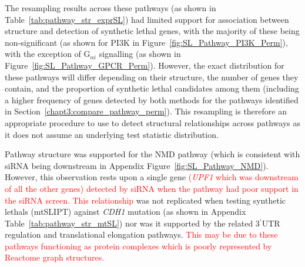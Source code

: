 The resampling results across these \glspl{pathway} (as shown in Table~\ref{tab:pathway_str_exprSL}) had limited support for association between  structure and detection of \gls{synthetic lethal} genes, with the majority of these being non-significant (as shown for PI3K in Figure~\ref{fig:SL_Pathway_PI3K_Perm}), with the exception of G$_{\alpha i}$ signalling (as shown in Figure~\ref{fig:SL_Pathway_GPCR_Perm}). However, the exact distribution for these \glspl{pathway} will differ depending on their structure, the number of genes they contain, and the proportion of \gls{synthetic lethal} candidates among them (including a higher frequency of genes detected by both methods for the \glspl{pathway} identified in Section~\ref{chapt3:compare_pathway_perm}). This resampling is therefore an appropriate procedure to use to detect structural relationships across \glspl{pathway} as it does not assume an underlying test statistic distribution.

Pathway structure was supported for the \gls{NMD} \gls{pathway} (which is consistent with \gls{siRNA} being downstream in Appendix Figure~\ref{fig:SL_Pathway_NMD}). However, this observation rests upon a single gene \textcolor{red}{(\textit{UPF1} which was downstream of all the other genes) detected by \gls{siRNA} when the pathway had poor support in the \gls{siRNA} screen. This relationship} was not replicated when testing \glspl{synthetic lethal} (\acrshort{mtSLIPT}) against \textit{CDH1} \gls{mutation} (as shown in Appendix Table~\ref{tab:pathway_str_mtSL}) nor was it supported by the related 3$^\prime $\gls{UTR} regulation and translational elongation \glspl{pathway}. \textcolor{red}{This may be due to these pathways functioning as protein complexes which is poorly represented by Reactome graph structures.}

